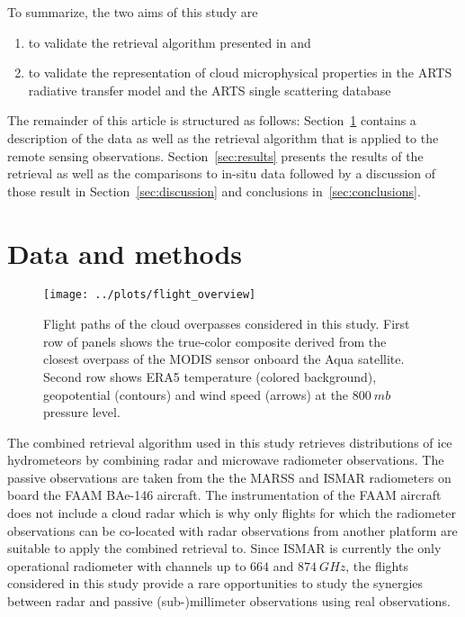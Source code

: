 \documentclass[journal abbreviation, manuscript]{copernicus}
\begin{document}
To summarize, the two aims of this study are
\begin{enumerate}
 \item to validate the retrieval algorithm presented in \citep{pfreundschuh19} and
 \item to validate the representation of cloud microphysical properties in the
   ARTS radiative transfer model and the ARTS single scattering database
\end{enumerate}
The remainder of this article is structured as follows:
Section~\ref{sec:methods_and_data} contains a description of the data as well as
the retrieval algorithm that is applied to the remote sensing observations.
Section~\ref{sec:results} presents the results of the retrieval as well as the
comparisons to in-situ data followed by a discussion of those result in
Section~\ref{sec:discussion} and conclusions in~\ref{sec:conclusions}.


\section{Data and methods}
\label{sec:methods_and_data}

\begin{figure}[h!]
  \centering \texttt{[image: ../plots/flight\_overview]}
  \caption{Flight paths of the cloud overpasses considered in this study. First
    row of panels shows the true-color composite derived from the closest
    overpass of the MODIS sensor onboard the Aqua satellite. Second row shows
    ERA5 temperature (colored background), geopotential (contours) and wind
    speed (arrows) at the $800\ \unit{mb}$ pressure level.}
  \label{fig:flight_paths}
\end{figure}

The combined retrieval algorithm used in this study retrieves distributions of
ice hydrometeors by combining radar and microwave radiometer observations. The
passive observations are taken from the the MARSS \citep{mcgrath01} and ISMAR
\citep{fox17} radiometers on board the FAAM BAe-146 aircraft. The
instrumentation of the FAAM aircraft does not include a cloud radar which is why
only flights for which the radiometer observations can be co-located with radar
observations from another platform are suitable to apply the combined retrieval
to. Since ISMAR is currently the only operational radiometer with channels up to
$664$ and $874\ \unit{GHz}$, the flights considered in this study provide a rare
opportunities to study the synergies between radar and passive (sub-)millimeter
observations using real observations.
\end{document}
